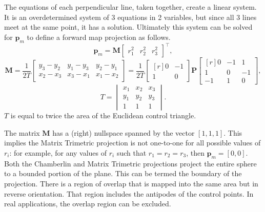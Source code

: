 \documentclass[]{interact}
\begin{document}
The equations of each perpendicular line, taken together, create a linear
system. It is an overdetermined system of 3 equations in 2 variables, but since
all 3 lines meet at the same point, it has a solution. Ultimately this system
can be solved for $\mathbf p_m$ to define a forward map projection as follows.
\begin{equation}\label{eq:forward}
\mathbf p_m = \mathbf M \begin{bmatrix*} r^2_1 & r^2_2 & r^2_3 \end{bmatrix*}^\top,
\end{equation}
\begin{equation}\label{eq:forwardm}
\mathbf M = \frac{1}{2T}
\begin{bmatrix*} y_3 - y_2 & y_1 - y_3 & y_2 - y_1 \\
x_2 - x_3 & x_3 - x_1 & x_1 - x_2 \end{bmatrix*} = \frac{1}{2T}
\begin{bmatrix*}[r] 0 & -1  \\
1 & 0 \end{bmatrix*}
\mathbf P
\begin{bmatrix*}[r] 0 & -1 & 1 \\
1 & 0 & -1 \\
-1 & 1 & 0 \end{bmatrix*},
\end{equation}
\begin{equation}\label{eq:forwardt}
T = \begin{vmatrix*} x_1 & x_2 & x_3 \\
 y_1 & y_2 & y_3 \\
 1 & 1 & 1
\end{vmatrix*}.
\end{equation}
$T$ is equal to twice the area of the Euclidean control triangle.

The matrix $\mathbf M$ has a (right) nullspace spanned by the vector
$[1, 1, 1]$. This implies the Matrix Trimetric projection is not one-to-one for
all possible values of $r_i$: for example, for any values of $r_i$ such that
$r_1 = r_2 = r_3$, then $\mathbf p_m = [0, 0]$. Both the Chamberlin and Matrix
Trimetric projections project the entire sphere to a bounded portion of the
plane. This can be termed the boundary of the projection. There is a region of
overlap that is mapped into the same area but in reverse orientation. That
region includes the antipodes of the control points.
In real applications, the overlap region can be excluded.
\end{document}
